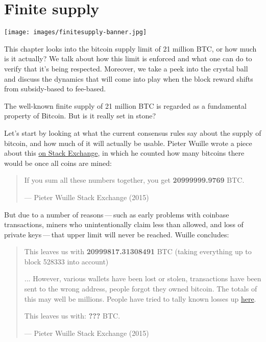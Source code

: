 \hypertarget{finitesupply}{%
\section{Finite supply}\label{finitesupply}}

\texttt{[image: images/finitesupply-banner.jpg]}

This chapter looks into the bitcoin supply limit of 21 million BTC, or
how much is it actually? We talk about how this limit is enforced and
what one can do to verify that it's being respected. Moreover, we take a
peek into the crystal ball and discuss the dynamics that will come into
play when the block reward shifts from subsidy-based to fee-based.

The well-known finite supply of 21 million BTC is regarded as a
fundamental property of Bitcoin. But is it really set in stone?

Let's start by looking at what the current consensus rules say about the
supply of bitcoin, and how much of it will actually be usable. Pieter
Wuille wrote a piece about this
\href{https://bitcoin.stackexchange.com/a/38998/69518}{on Stack
Exchange}, in which he counted how many bitcoins there would be once all
coins are mined:

\begin{quote}
If you sum all these numbers together, you get \textbf{20999999.9769}
BTC.

---  Pieter Wuille Stack Exchange (2015)
\end{quote}

But due to a number of reasons --- such as early problems with coinbase
transactions, miners who unintentionally claim less than allowed, and
loss of private keys --- that upper limit will never be reached. Wuille
concludes:

\begin{quote}
This leaves us with \textbf{20999817.31308491} BTC (taking everything up
to block 528333 into account)

... However, various wallets have been lost or stolen, transactions have
been sent to the wrong address, people forgot they owned bitcoin. The
totals of this may well be millions. People have tried to tally known
losses up \href{https://bitcointalk.org/index.php?topic=7253.0}{here}.

This leaves us with: \textbf{???} BTC.

---  Pieter Wuille Stack Exchange (2015)
\end{quote}

